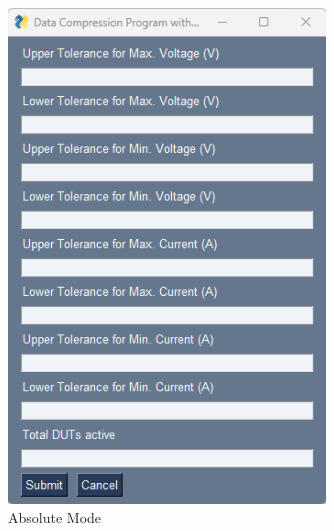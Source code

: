 \begin{figure}[!h]
    	\centering
    	\includegraphics[width= 0.75\textwidth]{images/GUI-Absol.png}
    	\caption [Absolute Values]{Absolute Mode}  
    	\label{fig:Absolute Mode}
\end{figure}

